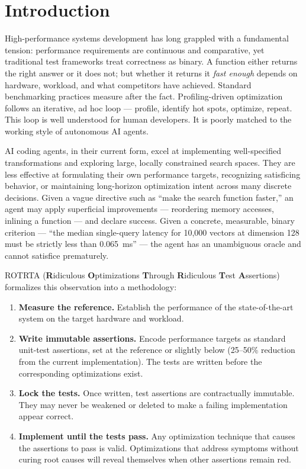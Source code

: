 \documentclass[conference]{IEEEtran}
\begin{document}
\section{Introduction}
\label{sec:intro}

High-performance systems development has long grappled with a fundamental
tension: performance requirements are continuous and comparative, yet
traditional test frameworks treat correctness as binary.  A function either
returns the right answer or it does not; but whether it returns it \emph{fast
enough} depends on hardware, workload, and what competitors have achieved.
Standard benchmarking practices measure after the fact.  Profiling-driven
optimization follows an iterative, ad hoc loop --- profile, identify hot spots,
optimize, repeat.  This loop is well understood for human developers.  It is
poorly matched to the working style of autonomous AI agents.

AI coding agents, in their current form, excel at implementing well-specified
transformations and exploring large, locally constrained search spaces.  They
are less effective at formulating their own performance targets, recognizing
satisficing behavior, or maintaining long-horizon optimization intent across
many discrete decisions.  Given a vague directive such as ``make the search
function faster,'' an agent may apply superficial improvements --- reordering
memory accesses, inlining a function --- and declare success.  Given a concrete,
measurable, binary criterion --- ``the median single-query latency for
10{,}000 vectors at dimension 128 must be strictly less than \SI{0.065}{\ms}''
--- the agent has an unambiguous oracle and cannot satisfice prematurely.

ROTRTA (\textbf{R}idiculous \textbf{O}ptimizations \textbf{T}hrough
\textbf{R}idiculous \textbf{T}est \textbf{A}ssertions) formalizes this
observation into a methodology:

\begin{enumerate}
  \item \textbf{Measure the reference.}  Establish the performance of the
        state-of-the-art system on the target hardware and workload.
  \item \textbf{Write immutable assertions.}  Encode performance targets as
        standard unit-test assertions, set at the reference or slightly
        below (25--50\% reduction from the current implementation).  The
        tests are written before the corresponding optimizations exist.
  \item \textbf{Lock the tests.}  Once written, test assertions are
        contractually immutable.  They may never be weakened or deleted
        to make a failing implementation appear correct.
  \item \textbf{Implement until the tests pass.}  Any optimization
        technique that causes the assertions to pass is valid.
        Optimizations that address symptoms without curing root causes
        will reveal themselves when other assertions remain red.
\end{enumerate}
\end{document}
